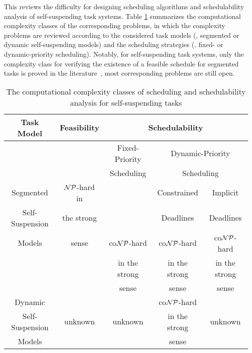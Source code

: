 \label{sec:hardness}
This \mysectionrefnormal{} reviews the difficulty for designing scheduling algorithms and schedulability analysis of self-suspending task systems. Table \ref{table:complexity} summarizes the computational complexity classes of the corresponding problems, in which the complexity problems are reviewed according to the considered task models (\ie, segmented or dynamic self-suspending models) and the scheduling strategies (\ie, fixed- or dynamic-priority scheduling). Notably, for self-suspending task systems, only the complexity class for verifying the existence of a feasible schedule for segmented tasks is proved in the literature~\cite{Ric03,Ridouard_2004}, most corresponding problems are still open.

\begin{table}[t]
\centering
    \begin{tabular}{|c|c|c|c|c|}
 \hline
        Task Model & Feasibility & \multicolumn{3}{c|}{Schedulability} \\
        \hline
        &  & Fixed-Priority & \multicolumn{2}{c|}{Dynamic-Priority}\\
        &  & Scheduling     & \multicolumn{2}{c|}{Scheduling}\\
        \cline{3-5}    
        Segmented & ${\cal NP}$-hard in &  & Constrained & Implicit\\
         Self-Suspension  & the strong &   & Deadlines   & Deadlines \\
        \cline{4-5}
        Models & sense \cite{Ridouard_2004} & co${\cal NP}$-hard& co${\cal NP}$-hard & co${\cal NP}$-hard \\
        &  & in the strong & in the strong & in the strong\\
        & & sense& sense & sense\\
        \hline
        Dynamic & \multirow{3}{*}{unknown} & & co${\cal NP}$-hard& \multirow{3}{*}{unknown}\\
         Self-Suspension & & unknown &in the strong& \\
        Models & & & sense & \\
        \hline
    \end{tabular}
    \vskip 0.2in
    \caption{The computational complexity classes of scheduling and schedulability analysis for self-suspending tasks}
    \label{table:complexity}
\end{table}


